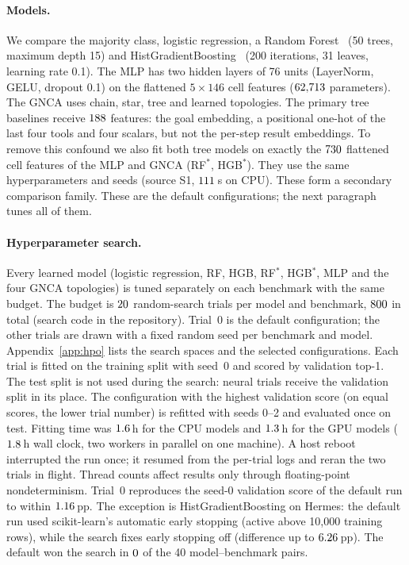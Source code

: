 \documentclass[10pt]{article}
\begin{document}
\paragraph{Models.} We compare the majority class, logistic regression, a Random Forest~\citep{breiman2001random} (50 trees, maximum depth 15) and HistGradientBoosting~\citep{friedman2001greedy} (200 iterations, 31 leaves, learning rate 0.1). The MLP has two hidden layers of 76 units (LayerNorm, GELU, dropout 0.1) on the flattened $5\times146$ cell features ($62{,}713$ parameters). The GNCA uses chain, star, tree and learned topologies. The primary tree baselines receive $188$ features: the goal embedding, a positional one-hot of the last four tools and four scalars, but not the per-step result embeddings. To remove this confound we also fit both tree models on exactly the $730$ flattened cell features of the MLP and GNCA (RF$^\ast$, HGB$^\ast$). They use the same hyperparameters and seeds (source S1, $111$\,s on CPU). These form a secondary comparison family. These are the default configurations; the next paragraph tunes all of them.
\paragraph{Hyperparameter search.} Every learned model (logistic regression, RF, HGB, RF$^\ast$, HGB$^\ast$, MLP and the four GNCA topologies) is tuned separately on each benchmark with the same budget. The budget is $20$ random-search trials per model and benchmark, $800$ in total (search code in the repository). Trial~0 is the default configuration; the other trials are drawn with a fixed random seed per benchmark and model. Appendix~\ref{app:hpo} lists the search spaces and the selected configurations. Each trial is fitted on the training split with seed~0 and scored by validation top-1. The test split is not used during the search: neural trials receive the validation split in its place. The configuration with the highest validation score (on equal scores, the lower trial number) is refitted with seeds 0--2 and evaluated once on test. Fitting time was $1.6$\,h for the CPU models and $1.3$\,h for the GPU models ($1.8$\,h wall clock, two workers in parallel on one machine). A host reboot interrupted the run once; it resumed from the per-trial logs and reran the two trials in flight. Thread counts affect results only through floating-point nondeterminism. Trial~0 reproduces the seed-0 validation score of the default run to within $1.16$\,pp. The exception is HistGradientBoosting on Hermes: the default run used scikit-learn's automatic early stopping (active above 10{,}000 training rows), while the search fixes early stopping off (difference up to $6.26$\,pp). The default won the search in $0$ of the 40 model--benchmark pairs.
\end{document}
